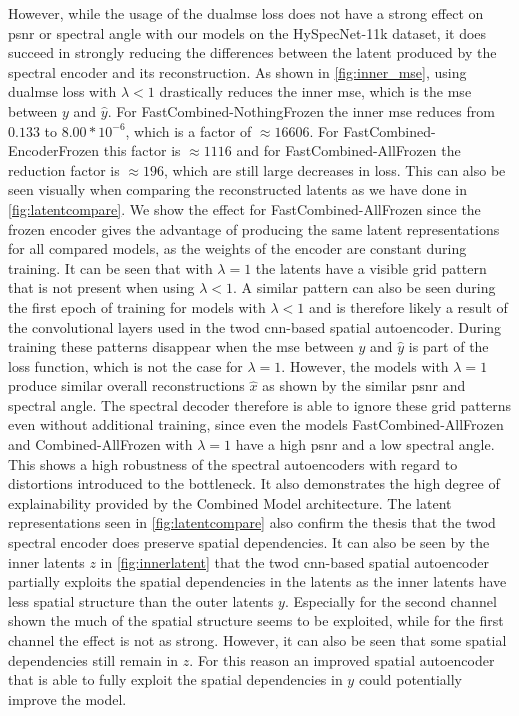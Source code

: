 However, while the usage of the \ac{dualmse} loss does not have a strong effect on \ac{psnr} or spectral angle with our models on the HySpecNet-11k dataset, it does succeed in strongly reducing the differences between the latent produced by the spectral encoder and its reconstruction. As shown in \autoref{fig:inner_mse}, using \ac{dualmse} loss with $\lambda < 1$ drastically reduces the inner \ac{mse}, which is the \ac{mse} between $y$ and $\hat{y}$. For FastCombined-NothingFrozen the inner \ac{mse} reduces from $0.133$ to $8.00*10^{-6}$, which is a factor of $\approx 16606$. For FastCombined-EncoderFrozen this factor is $\approx 1116$ and for FastCombined-AllFrozen the reduction factor is $\approx 196$, which are still large decreases in loss. This can also be seen visually when comparing the reconstructed latents as we have done in \autoref{fig:latentcompare}. We show the effect for FastCombined-AllFrozen since the frozen encoder gives the advantage of producing the same latent representations for all compared models, as the weights of the encoder are constant during training. It can be seen that with $\lambda=1$ the latents have a visible grid pattern that is not present when using $\lambda < 1$. A similar pattern can also be seen during the first epoch of training for models with $\lambda < 1$ and is therefore likely a result of the convolutional layers used in the \ac{twod} \ac{cnn}-based spatial autoencoder. During training these patterns disappear when the \ac{mse} between $y$ and $\hat{y}$ is part of the loss function, which is not the case for $\lambda=1$. However, the models with $\lambda=1$ produce similar overall reconstructions $\hat{x}$ as shown by the similar \ac{psnr} and spectral angle. The spectral decoder therefore is able to ignore these grid patterns even without additional training, since even the models FastCombined-AllFrozen and Combined-AllFrozen with $\lambda=1$ have a high \ac{psnr} and a low spectral angle. This shows a high robustness of the spectral autoencoders with regard to distortions introduced to the bottleneck. It also demonstrates the high degree of explainability provided by the Combined Model architecture. The latent representations seen in \autoref{fig:latentcompare} also confirm the thesis that the \ac{twod} spectral encoder does preserve spatial dependencies. It can also be seen by the inner latents $z$ in \autoref{fig:innerlatent} that the \ac{twod} \ac{cnn}-based spatial autoencoder partially exploits the spatial dependencies in the latents as the inner latents have less spatial structure than the outer latents $y$. Especially for the second channel shown the much of the spatial structure seems to be exploited, while for the first channel the effect is not as strong. However, it can also be seen that some spatial dependencies still remain in $z$. For this reason an improved spatial autoencoder that is able to fully exploit the spatial dependencies in $y$ could potentially improve the model.

